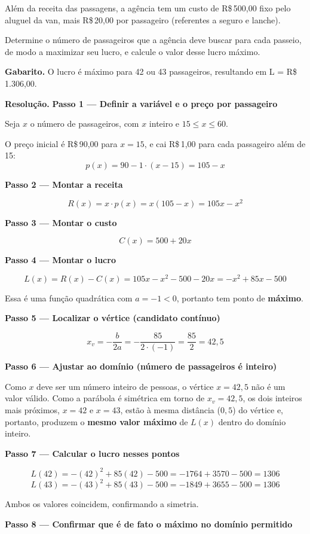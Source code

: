 \documentclass[11pt,a4paper]{article}
\begin{document}
Além da receita das passagens, a agência tem um custo de R\$\,500,00 fixo pelo aluguel da van, mais R\$\,20,00 por passageiro (referentes a seguro e lanche).

Determine o número de passageiros que a agência deve buscar para cada passeio, de modo a maximizar seu lucro, e calcule o valor desse lucro máximo.

\textbf{Gabarito.} O lucro é máximo para 42 ou 43 passageiros, resultando em L = R\$\,1.306,00.

\textbf{Resolução.} \textbf{Passo 1 — Definir a variável e o preço por passageiro}

Seja $x$ o número de passageiros, com $x$ inteiro e $15 \le x \le 60$.

O preço inicial é R\$\,90,00 para $x=15$, e cai R\$\,1,00 para cada passageiro além de 15:
$$p(x) = 90 - 1\cdot(x-15) = 105 - x$$

\textbf{Passo 2 — Montar a receita}

$$R(x) = x \cdot p(x) = x(105-x) = 105x - x^2$$

\textbf{Passo 3 — Montar o custo}

$$C(x) = 500 + 20x$$

\textbf{Passo 4 — Montar o lucro}

$$L(x) = R(x) - C(x) = 105x - x^2 - 500 - 20x = -x^2 + 85x - 500$$

Essa é uma função quadrática com $a=-1<0$, portanto tem ponto de \textbf{máximo}.

\textbf{Passo 5 — Localizar o vértice (candidato contínuo)}

$$x_v = -\dfrac{b}{2a} = -\dfrac{85}{2\cdot(-1)} = \dfrac{85}{2} = 42{,}5$$

\textbf{Passo 6 — Ajustar ao domínio (número de passageiros é inteiro)}

Como $x$ deve ser um número inteiro de pessoas, o vértice $x=42{,}5$ não é um valor válido. Como a parábola é simétrica em torno de $x_v=42{,}5$, os dois inteiros mais próximos, $x=42$ e $x=43$, estão à mesma distância ($0{,}5$) do vértice e, portanto, produzem o \textbf{mesmo valor máximo} de $L(x)$ dentro do domínio inteiro.

\textbf{Passo 7 — Calcular o lucro nesses pontos}

$$L(42) = -(42)^2 + 85(42) - 500 = -1764 + 3570 - 500 = 1306$$
$$L(43) = -(43)^2 + 85(43) - 500 = -1849 + 3655 - 500 = 1306$$

Ambos os valores coincidem, confirmando a simetria.

\textbf{Passo 8 — Confirmar que é de fato o máximo no domínio permitido}
\end{document}
